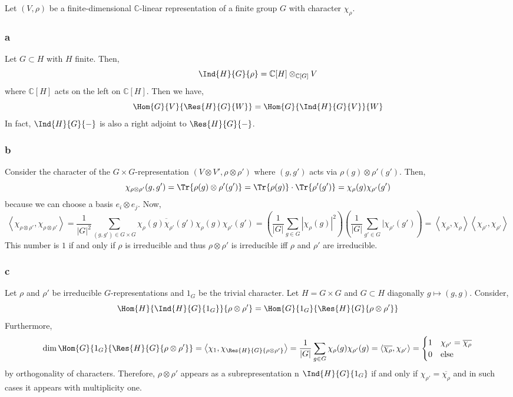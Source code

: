 \documentclass[12pt]{article}
\renewcommand{\C}{\mathbb{C}}
\begin{document}
Let $(V, \rho)$ be a finite-dimensional $\C$-linear representation of a finite group $G$ with character $\chi_\rho$.

\subsubsection{a}

Let $G \subset H$ with $H$ finite. Then,
\[ \Ind{H}{G}{\rho} = \C[H] \otimes_{\C[G]} V \]
where $\C[H]$ acts on the left on $\C[H]$. Then we have,
\[ \Hom{G}{V}{\Res{H}{G}{W}} = \Hom{G}{\Ind{H}{G}{V}}{W} \]
In fact, $\Ind{H}{G}{-}$ is also a right adjoint to $\Res{H}{G}{-}$.

\subsubsection{b}

Consider the character of the $G \times G$-representation $(V \otimes V', \rho \otimes \rho')$ where $(g, g')$ acts via $\rho(g) \otimes \rho'(g')$. Then,
\[ \chi_{\rho \otimes \rho'}(g, g') = \Tr{\rho(g) \otimes \rho'(g')} = \Tr{\rho(g)} \cdot \Tr{\rho'(g')} = \chi_{\rho}(g) \chi_{\rho'}(g') \]
because we can choose a basis $e_i \otimes e_j$. Now,
\[ \left< \chi_{\rho \otimes \rho'}, \chi_{\rho \otimes \rho'} \right> = \frac{1}{|G|^2} \sum_{(g,g') \in G \times G} \overline{\chi_\rho(g) \chi_{\rho'}(g')} \chi_{\rho}(g) \chi_{\rho'}(g') = \left( \frac{1}{|G|} \sum_{g \in G} |\chi_\rho(g)|^2 \right) \left( \frac{1}{|G|} \sum_{g' \in G} |\chi_{\rho'}(g') \right) = \left< \chi_\rho, \chi_\rho \right> \left< \chi_{\rho'}, \chi_{\rho'} \right> \]
This number is $1$ if and only if $\rho$ is irreducible and thus $\rho \otimes \rho'$ is irreducible iff $\rho$ and $\rho'$ are irreducible.

\subsubsection{c}

Let $\rho$ and $\rho'$ be irreducible $G$-representations and $1_G$ be the trivial character. Let $H = G \times G$ and $G \subset H$ diagonally $g \mapsto (g,g)$. Consider,
\[ \Hom{H}{\Ind{H}{G}{1_G}}{\rho \otimes \rho'} = \Hom{G}{1_G}{\Res{H}{G}{\rho \otimes \rho'}} \]
Furthermore,
\[ \dim{\Hom{G}{1_G}{\Res{H}{G}{\rho \otimes \rho'}}} = \left< \chi_1, \chi_{\Res{H}{G}{\rho \otimes \rho'}} \right> = \frac{1}{|G|} \sum_{g \in G} \chi_\rho(g) \chi_{\rho'}(g) = \left< \overline{\chi_\rho}, \chi_{\rho'} \right> = 
\begin{cases}
1 & \chi_{\rho'} = \overline{\chi_{\rho}}
\\
0 & \text{else} 
\end{cases} \]
by orthogonality of characters. Therefore, $\rho \otimes \rho'$ appears as a subrepresentation n $\Ind{H}{G}{1_G}$ if and only if $\chi_{\rho'} = \overline{\chi_{\rho}}$ and in such cases it appears with multiplicity one. 
\end{document}
